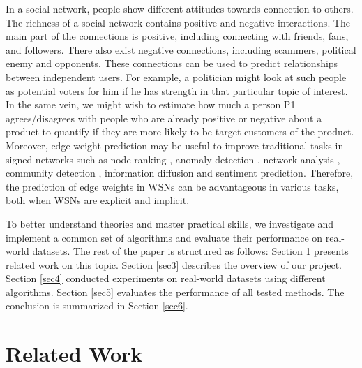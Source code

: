 \documentclass{article}
\begin{document}
In a social network, people show different attitudes towards 
connection to others. The richness of a social network contains 
positive and negative interactions. The main part of the connections 
is positive, including connecting with friends, fans, and
followers. There also exist negative connections, including 
scammers, political enemy and opponents. These connections can 
be used to predict relationships between independent users. 
For example, a politician might look at such people as potential 
voters for him if he has strength in that particular topic of 
interest. In the same vein, we might wish to estimate how much 
a person P1 agrees/disagrees with people who are already 
positive or negative about a product to quantify if 
they are more likely to be target customers of the product. 
Moreover, edge weight prediction may be useful to improve 
traditional tasks in signed networks such as node ranking
\cite{shahriari2014ranking}, anomaly detection\cite{Kmumar2014}
\cite{Wu:2016:TMR:2835776.2835816}, network 
analysis\cite{Kumar:2016:SDS:2872518.2889391}
\cite{leskovec2010signed}, community detection
\cite{PhysRevE.80.036115}, information diffusion
\cite{Shafaei_2014} \cite{Li2014} and sentiment 
prediction\cite{west2014}. Therefore, the prediction of edge 
weights in WSNs can be advantageous in various tasks, both 
when WSNs are explicit and implicit.

To better understand theories and master practical skills, we investigate and implement a common set of algorithms and evaluate their performance on real-world datasets. The rest of the paper is structured as follows: Section \ref{sec2} presents related work on this topic. Section \ref{sec3} describes the overview of our project. Section \ref{sec4} conducted experiments on real-world datasets using different algorithms. Section \ref{sec5} evaluates the performance of all tested methods. The conclusion is summarized in Section \ref{sec6}.

\section{Related Work}
\label{sec2}
\end{document}
